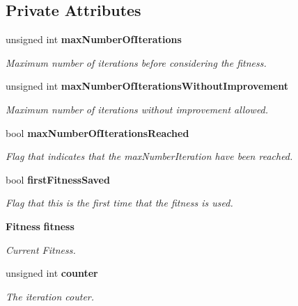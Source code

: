 \subsection*{Private Attributes}
\begin{CompactItemize}
\item 
unsigned int {\bf max\-Number\-Of\-Iterations}\label{classmo_steady_fit_sol_continue_r0}

\begin{CompactList}\small\item\em Maximum number of iterations before considering the fitness. \item\end{CompactList}\item 
unsigned int {\bf max\-Number\-Of\-Iterations\-Without\-Improvement}\label{classmo_steady_fit_sol_continue_r1}

\begin{CompactList}\small\item\em Maximum number of iterations without improvement allowed. \item\end{CompactList}\item 
bool {\bf max\-Number\-Of\-Iterations\-Reached}\label{classmo_steady_fit_sol_continue_r2}

\begin{CompactList}\small\item\em Flag that indicates that the max\-Number\-Iteration have been reached. \item\end{CompactList}\item 
bool {\bf first\-Fitness\-Saved}\label{classmo_steady_fit_sol_continue_r3}

\begin{CompactList}\small\item\em Flag that this is the first time that the fitness is used. \item\end{CompactList}\item 
{\bf Fitness} {\bf fitness}\label{classmo_steady_fit_sol_continue_r4}

\begin{CompactList}\small\item\em Current Fitness. \item\end{CompactList}\item 
unsigned int {\bf counter}\label{classmo_steady_fit_sol_continue_r5}

\begin{CompactList}\small\item\em The iteration couter. \item\end{CompactList}\end{CompactItemize}


